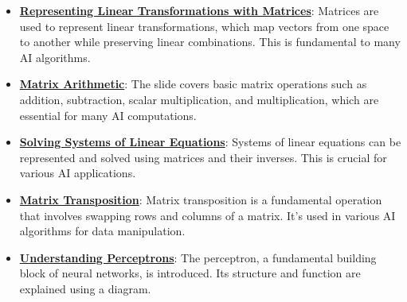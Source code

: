 \documentclass{article}%
\begin{document}
\begin{itemize}[leftmargin=*]%
\item \href{https://purdue.brightspace.com/d2l/common/assets/pdfjs-d2l-dist/1.0.14-legacy/web/viewer.html?file=\%2Fcontent\%2Fenforced\%2F1095467-wl.202510.CS.24300.001\%2F04L1-Linear Algebra Primer.pdf\%3Fou\%3D1095467\&lang=en-us\&container=d2l-fileviewer-rendered-pdf\&fullscreen=d2l-fileviewer-rendered-pdf-dialog\&height=667#page=5}{\textbf{Representing Linear Transformations with Matrices}}: Matrices are used to represent linear transformations, which map vectors from one space to another while preserving linear combinations. This is fundamental to many AI algorithms.%
\item \href{https://purdue.brightspace.com/d2l/common/assets/pdfjs-d2l-dist/1.0.14-legacy/web/viewer.html?file=\%2Fcontent\%2Fenforced\%2F1095467-wl.202510.CS.24300.001\%2F04L1-Linear Algebra Primer.pdf\%3Fou\%3D1095467\&lang=en-us\&container=d2l-fileviewer-rendered-pdf\&fullscreen=d2l-fileviewer-rendered-pdf-dialog\&height=667#page=9}{\textbf{Matrix Arithmetic}}: The slide covers basic matrix operations such as addition, subtraction, scalar multiplication, and multiplication, which are essential for many AI computations.%
\item \href{https://purdue.brightspace.com/d2l/common/assets/pdfjs-d2l-dist/1.0.14-legacy/web/viewer.html?file=\%2Fcontent\%2Fenforced\%2F1095467-wl.202510.CS.24300.001\%2F04L1-Linear Algebra Primer.pdf\%3Fou\%3D1095467\&lang=en-us\&container=d2l-fileviewer-rendered-pdf\&fullscreen=d2l-fileviewer-rendered-pdf-dialog\&height=667#page=11}{\textbf{Solving Systems of Linear Equations}}: Systems of linear equations can be represented and solved using matrices and their inverses. This is crucial for various AI applications.%
\item \href{https://purdue.brightspace.com/d2l/common/assets/pdfjs-d2l-dist/1.0.14-legacy/web/viewer.html?file=\%2Fcontent\%2Fenforced\%2F1095467-wl.202510.CS.24300.001\%2F04L1-Linear Algebra Primer.pdf\%3Fou\%3D1095467\&lang=en-us\&container=d2l-fileviewer-rendered-pdf\&fullscreen=d2l-fileviewer-rendered-pdf-dialog\&height=667#page=16}{\textbf{Matrix Transposition}}: Matrix transposition is a fundamental operation that involves swapping rows and columns of a matrix. It's used in various AI algorithms for data manipulation.%
\item \href{https://purdue.brightspace.com/d2l/common/assets/pdfjs-d2l-dist/1.0.14-legacy/web/viewer.html?file=\%2Fcontent\%2Fenforced\%2F1095467-wl.202510.CS.24300.001\%2F04L1-Linear Algebra Primer.pdf\%3Fou\%3D1095467\&lang=en-us\&container=d2l-fileviewer-rendered-pdf\&fullscreen=d2l-fileviewer-rendered-pdf-dialog\&height=667#page=17}{\textbf{Understanding Perceptrons}}: The perceptron, a fundamental building block of neural networks, is introduced. Its structure and function are explained using a diagram.%

\end{itemize}
\end{document}
